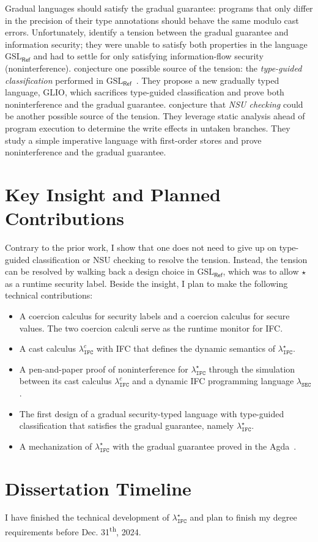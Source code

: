 \documentclass[10pt, letterpaper]{article}
\newcommand{\key}[1]{\ensuremath{\mathtt{#1}}}
\newcommand{\Surface}{\ensuremath{\lambda_{\mathtt{IFC}}^\star}\xspace}
\newcommand{\CC}{\ensuremath{\lambda_{\mathtt{IFC}}^{c}}\xspace}
\newcommand{\DynIFC}{\ensuremath{\lambda_{\mathtt{SEC}}}\xspace}
\newcommand{\GSLRef}{\ensuremath{\mathrm{GSL}_\mathsf{Ref}}\xspace}
\newcommand{\unk}{\key{\star}\xspace}
\begin{document}
Gradual languages should satisfy the gradual guarantee: programs that only
differ in the precision of their type annotations should behave the same modulo
cast errors. Unfortunately, \citet{Toro:2018aa} identify a tension between the
gradual guarantee and information security; they were unable to satisfy both
properties in the language \GSLRef and had to settle for only satisfying
information-flow security (noninterference). \citet{Amorim:2020aa} conjecture
one possible source of the tension: the \textit{type-guided classification}
performed in \GSLRef~\citep{Toro:2018aa}. They propose a new gradually typed language,
GLIO, which sacrifices type-guided classification and prove both noninterference and
the gradual guarantee. \citet{bichhawat2021gradual} conjecture that \textit{NSU checking}
could be another possible source of the tension.
They leverage static analysis ahead of program execution to determine
the write effects in untaken branches. They study a
simple imperative language with first-order stores and prove
noninterference and the gradual guarantee.

\section{Key Insight and Planned Contributions}

Contrary to the prior work, I show that one does not need
to give up on type-guided classification or NSU checking to resolve the tension.
Instead, the tension can be resolved by walking back a design choice in \GSLRef,
which was to allow \unk as a runtime security label.
Beside the insight, I plan to make the following technical contributions:

\begin{itemize}
\item A coercion calculus for security labels and a coercion calculus for secure values.
  The two coercion calculi serve as the runtime monitor for IFC.
\item A cast calculus \CC with IFC that defines the dynamic semantics of \Surface.
\item A pen-and-paper proof of noninterference for \Surface through the simulation
  between its cast calculus \CC and a dynamic IFC programming language \DynIFC.
\item The first design of a gradual security-typed language with type-guided classification
  that satisfies the gradual guarantee, namely \Surface.
\item A mechanization of \Surface with the gradual guarantee proved in the Agda~\citep{Bove:2009aa}.
\end{itemize}

\section{Dissertation Timeline}

I have finished the technical development of \Surface and plan to finish my degree requirements
before Dec. 31\textsuperscript{th}, 2024.

\clearpage


\end{document}
